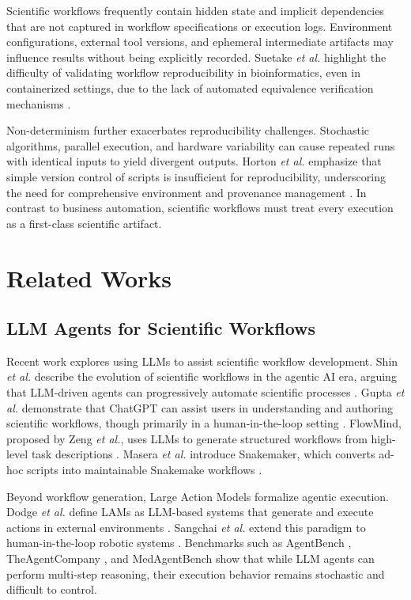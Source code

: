 \documentclass[conference]{IEEEtran}
\begin{document}
Scientific workflows frequently contain hidden state and implicit dependencies that are not captured in workflow specifications or execution logs. Environment configurations, external tool versions, and ephemeral intermediate artifacts may influence results without being explicitly recorded. Suetake \textit{et al.} highlight the difficulty of validating workflow reproducibility in bioinformatics, even in containerized settings, due to the lack of automated equivalence verification mechanisms \cite{suetake2023workflow}.

Non-determinism further exacerbates reproducibility challenges. Stochastic algorithms, parallel execution, and hardware variability can cause repeated runs with identical inputs to yield divergent outputs. Horton \textit{et al.} emphasize that simple version control of scripts is insufficient for reproducibility, underscoring the need for comprehensive environment and provenance management \cite{horton2022reproducibility}. In contrast to business automation, scientific workflows must treat every execution as a first-class scientific artifact.

\section{Related Works}

\subsection{LLM Agents for Scientific Workflows}

Recent work explores using LLMs to assist scientific workflow development. Shin \textit{et al.} describe the evolution of scientific workflows in the agentic AI era, arguing that LLM-driven agents can progressively automate scientific processes \cite{shin2025agentic}. Gupta \textit{et al.} demonstrate that ChatGPT can assist users in understanding and authoring scientific workflows, though primarily in a human-in-the-loop setting \cite{gupta2023chatgpt}. FlowMind, proposed by Zeng \textit{et al.}, uses LLMs to generate structured workflows from high-level task descriptions \cite{zeng2024flowmind}. Masera \textit{et al.} introduce Snakemaker, which converts ad-hoc scripts into maintainable Snakemake workflows \cite{masera2025snakemaker}.

Beyond workflow generation, Large Action Models formalize agentic execution. Dodge \textit{et al.} define LAMs as LLM-based systems that generate and execute actions in external environments \cite{dodge2024lam}. Sangchai \textit{et al.} extend this paradigm to human-in-the-loop robotic systems \cite{sangchai2025robotlam}. Benchmarks such as AgentBench \cite{liu2023agentbench}, TheAgentCompany \cite{xu2025agentcompany}, and MedAgentBench \cite{jiang2025medagentbench} show that while LLM agents can perform multi-step reasoning, their execution behavior remains stochastic and difficult to control.
\end{document}
